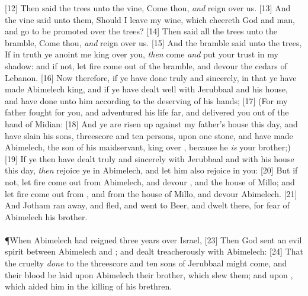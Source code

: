 [12] \textcolor[cmyk]{0.99998,1,0,0}{Then said the trees unto the vine, Come thou, \emph{and} reign over us.}
[13] \textcolor[cmyk]{0.99998,1,0,0}{And the vine said unto them, Should I leave my wine, which cheereth God and man, and go to be promoted over the trees?}
[14] \textcolor[cmyk]{0.99998,1,0,0}{Then said all the trees unto the bramble, Come thou, \emph{and} reign over us.}
[15] \textcolor[cmyk]{0.99998,1,0,0}{And the bramble said unto the trees, If in truth ye anoint me king over you, \emph{then} come \emph{and} put your trust in my shadow: and if not, let fire come out of the bramble, and devour the cedars of Lebanon.}
[16] \textcolor[cmyk]{0.99998,1,0,0}{Now therefore, if ye have done truly and sincerely, in that ye have made Abimelech king, and if ye have dealt well with Jerubbaal and his house, and have done unto him according to the deserving of his hands;}
[17] \textcolor[cmyk]{0.99998,1,0,0}{(For my father fought for you, and adventured his life far, and delivered you out of the hand of Midian:}
[18] \textcolor[cmyk]{0.99998,1,0,0}{And ye are risen up against my father's house this day, and have slain his sons, threescore and ten persons, upon one stone, and have made Abimelech, the son of his maidservant, king over , because he \emph{is} your brother;)}
[19] \textcolor[cmyk]{0.99998,1,0,0}{If ye then have dealt truly and sincerely with Jerubbaal and with his house this day, \emph{then} rejoice ye in Abimelech, and let him also rejoice in you:}
[20] \textcolor[cmyk]{0.99998,1,0,0}{But if not, let fire come out from Abimelech, and devour , and the house of Millo; and let fire come out from , and from the house of Millo, and devour Abimelech.}
[21] \textcolor[cmyk]{0.99998,1,0,0}{And Jotham ran away, and fled, and went to Beer, and dwelt there, for fear of Abimelech his brother.}\\
\\
\P \textcolor[cmyk]{0.99998,1,0,0}{When Abimelech had reigned three years over Israel,}
[23] \textcolor[cmyk]{0.99998,1,0,0}{Then God sent an evil spirit between Abimelech and ; and  dealt treacherously with Abimelech:}
[24] \textcolor[cmyk]{0.99998,1,0,0}{That the cruelty \emph{done} to the threescore and ten sons of Jerubbaal might come, and their blood be laid upon Abimelech their brother, which slew them; and upon , which aided him in the killing of his brethren.}
